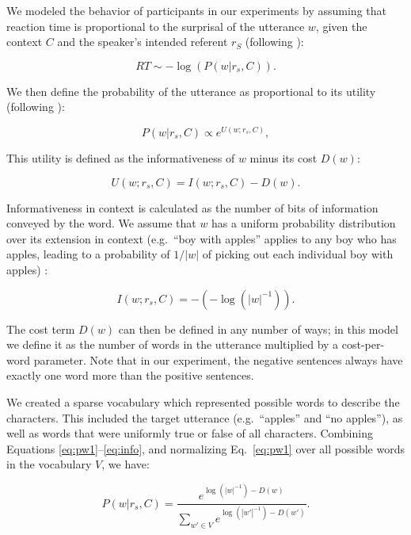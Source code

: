 \documentclass[man]{apa2}
\begin{document}
We modeled the behavior of participants in our experiments by assuming that reaction time is proportional to the surprisal of the utterance $w$, given the context $C$ and the speaker's intended referent $r_S$ (following ):

\begin{equation}\label{eq:surprise}
RT \sim -\log(P(w| r_s, C)).
\end{equation}

\noindent We then define the probability of the utterance as proportional to its utility (following ):

\begin{equation}\label{eq:pw1}
P(w | r_s, C) \propto  e^{U(w;r_s,C)},
\end{equation} 

\noindent This utility is defined as the informativeness of $w$ minus its cost $D(w)$:

\begin{equation}\label{eq:utility}
U(w;r_s,C) = I(w;r_s, C) - D(w).
\end{equation}

\noindent Informativeness in context is calculated as the number of bits of information conveyed by the word. We assume that $w$ has a uniform probability distribution over its extension in context (e.g.\ ``boy with apples'' applies to any boy who has apples, leading to a probability of $1/|w|$ of picking out each individual boy with apples) :

\begin{equation}\label{eq:info}
I(w;r_s, C) = -(-\log(|w|^{-1})).
\end{equation}

\noindent The cost term $D(w)$ can then be defined in any number of ways; in this model we define it as the number of words in the utterance multiplied by a cost-per-word parameter.  Note that in our experiment, the negative sentences always have exactly one word more than the positive sentences. 

We created a sparse vocabulary which represented possible words to describe the characters.  This included the target utterance (e.g.\ ``apples'' and ``no apples''), as well as words that were uniformly true or false of all characters. Combining Equations \ref{eq:pw1}--\ref{eq:info}, and normalizing Eq.\ \ref{eq:pw1} over all possible words in the vocabulary $V$, we have:

\begin{equation}\label{eq:pw2}
P(w | r_s, C) = \frac{ e^{\log(|w|^{-1}) - D(w)}} {\sum_{w' \in V}{e^{\log(|w'|^{-1}) - D(w')}}}.
\end{equation}
\end{document}
